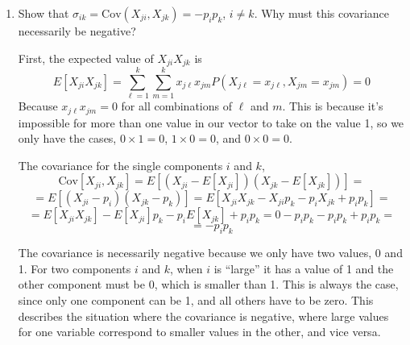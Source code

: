 \begin{enumerate}[label= (\alph*)]
    \item Show that $\sigma_{ik} = \text{Cov}(X_{ji}, X_{jk}) = - p_{i}p_{k}$, $i \ne k$. Why must this covariance necessarily be negative?
    
    First, the expected value of $X_{ji}X_{jk}$ is
    \[
        E[X_{ji}X_{jk}]
        =
        \sum_{\ell=1}^{k}\sum_{m=1}^{k}x_{j\ell}x_{jm}P(X_{j\ell} = x_{j\ell}, X_{jm} = x_{jm})
        =
        0
    \]
    Because $x_{j\ell}x_{jm} = 0$ for all combinations of $\ell$ and $m$. This is because it's impossible for more than one value in our vector to take on the value 1, so we only have the cases, $0 \times 1 = 0$, $1 \times 0 = 0$, and $0 \times 0 = 0$.

    The covariance for the single components $i$ and $k$,
    \[
        \text{Cov}[X_{ji}, X_{jk}]
        =
        E[(X_{ji} - E[X_{ji}])(X_{jk} - E[X_{jk}])]
        =
    \]
    \[
        =
        E[(X_{ji} - p_{i})(X_{jk} - p_{k})]
        =
        E[X_{ji}X_{jk} - X_{ji}p_{k} - p_{i}X_{jk} + p_{i}p_{k}]
        =
    \]
    \[
        =
        E[X_{ji}X_{jk}] - E[X_{ji}]p_{k} - p_{i}E[X_{jk}] + p_{i}p_{k}
        =
        0 - p_{i}p_{k} - p_{i}p_{k} + p_{i}p_{k}
        =
    \]
    \[
        =
        - p_{i}p_{k}
    \]

    The covariance is necessarily negative because we only have two values, 0 and 1. For two components $i$ and $k$, when $i$ is ``large'' it has a value of 1 and the other component must be 0, which is smaller than 1. This is always the case, since only one component can be 1, and all others have to be zero. This describes the situation where the covariance is negative, where large values for one variable correspond to smaller values in the other, and vice versa.
\end{enumerate}
